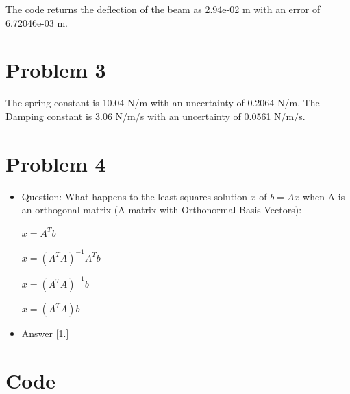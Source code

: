 \documentclass[]{report}
\begin{document}
		The code returns the deflection of the beam as 2.94e-02 m with an error of 6.72046e-03 m.
		
		
		\newpage
		
		
		
	\section{Problem 3}
	
	
	
	The spring constant is 10.04 N/m with an uncertainty of 0.2064 N/m.
	\newline
	The Damping constant is 3.06 N/m/s with an uncertainty of 0.0561 N/m/s.
	
	
	\newpage
	
	\section{Problem 4}
	
	\begin{itemize}
		\item Question: What happens to the least squares solution $x$ of $b = Ax$ when A is an orthogonal matrix (A matrix with Orthonormal Basis Vectors):
		
				\subitem[1.] $x = A^T b$
				
				\subitem[2.] $x = (A^T A)^{-1}  A^T b$
				
				\subitem[3.] $x = (A^T A)^{-1} b$
				
				\subitem[4.] $x = (A^T A) b$
				
				
			\item Answer [1.]
	\end{itemize}
	
	\newpage
	
	\section{Code}
	
	
	
	
	
	
\end{document}
